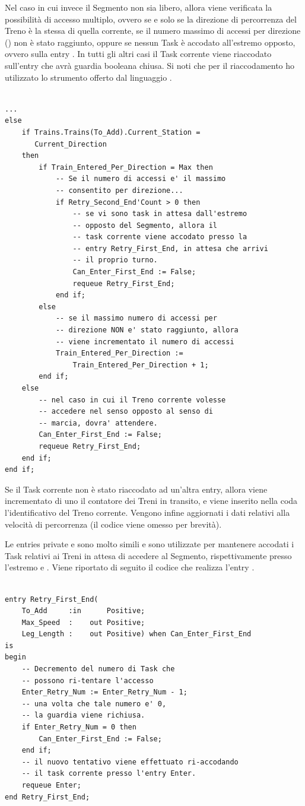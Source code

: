 Nel caso in cui invece il Segmento non sia libero, allora viene verificata la possibilità di accesso multiplo, ovvero se e solo se la direzione di percorrenza del Treno è la stessa di quella corrente, se il numero massimo di accessi per direzione () non è stato raggiunto, oppure se nessun Task è accodato all'estremo opposto, ovvero sulla entry . In tutti gli altri casi il Task corrente viene riaccodato sull'entry  che avrà guardia booleana chiusa. Si noti che per il riaccodamento ho utilizzato lo strumento  offerto dal linguaggio .

\begin{lstlisting}

...
else
	if Trains.Trains(To_Add).Current_Station = 
	   Current_Direction 
	then
		if Train_Entered_Per_Direction = Max then
			-- Se il numero di accessi e' il massimo 
			-- consentito per direzione...
			if Retry_Second_End'Count > 0 then
				-- se vi sono task in attesa dall'estremo
				-- opposto del Segmento, allora il
				-- task corrente viene accodato presso la 
				-- entry Retry_First_End, in attesa che arrivi
				-- il proprio turno.
				Can_Enter_First_End := False;
				requeue Retry_First_End;
			end if;
		else
			-- se il massimo numero di accessi per 
			-- direzione NON e' stato raggiunto, allora
			-- viene incrementato il numero di accessi
			Train_Entered_Per_Direction := 
				Train_Entered_Per_Direction + 1;
		end if;
	else
		-- nel caso in cui il Treno corrente volesse 
		-- accedere nel senso opposto al senso di 
		-- marcia, dovra' attendere.
		Can_Enter_First_End := False;
		requeue Retry_First_End;
	end if;
end if;
\end{lstlisting}

Se il Task corrente non è stato riaccodato ad un'altra entry, allora viene incrementato di uno il contatore dei Treni in transito, e viene inserito nella coda  l'identificativo del Treno corrente. Vengono infine aggiornati i dati relativi alla velocità di percorrenza (il codice viene omesso per brevità).

	Le entries private  e  sono molto simili e sono utilizzate per mantenere accodati i Task relativi ai Treni in attesa di accedere al Segmento, rispettivamente presso l'estremo  e . Viene riportato di seguito il codice che realizza l'entry .
	
	\begin{lstlisting}

entry Retry_First_End(
	To_Add     :in		Positive;
	Max_Speed  : 	out Positive;
	Leg_Length :	out	Positive) when Can_Enter_First_End
is
begin
	-- Decremento del numero di Task che 
	-- possono ri-tentare l'accesso
	Enter_Retry_Num := Enter_Retry_Num - 1;
	-- una volta che tale numero e' 0, 
	-- la guardia viene richiusa.
	if Enter_Retry_Num = 0 then
		Can_Enter_First_End := False;
	end if;
	-- il nuovo tentativo viene effettuato ri-accodando
	-- il task corrente presso l'entry Enter.
	requeue Enter;
end Retry_First_End;

	\end{lstlisting}
	
